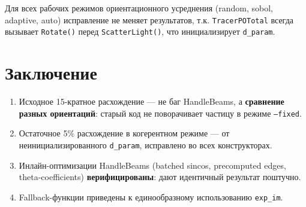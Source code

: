 \documentclass[a4paper,11pt]{article}
\begin{document}
Для всех рабочих режимов ориентационного усреднения (random, sobol, adaptive, auto)
исправление не меняет результатов, т.к. \texttt{TracerPOTotal} всегда вызывает
\texttt{Rotate()} перед \texttt{ScatterLight()}, что инициализирует \texttt{d\_param}.

\section{Заключение}

\begin{enumerate}
\item Исходное 15-кратное расхождение --- не баг HandleBeams, а \textbf{сравнение
  разных ориентаций}: старый код не поворачивает частицу в режиме \texttt{--fixed}.
\item Остаточное 5\% расхождение в когерентном режиме --- от неинициализированного
  \texttt{d\_param}, исправлено во всех конструкторах.
\item Инлайн-оптимизации HandleBeams (batched sincos, precomputed edges,
  theta-coefficients) \textbf{верифицированы}: дают идентичный результат поштучно.
\item Fallback-функции приведены к единообразному использованию \texttt{exp\_im}.
\end{enumerate}
\end{document}
